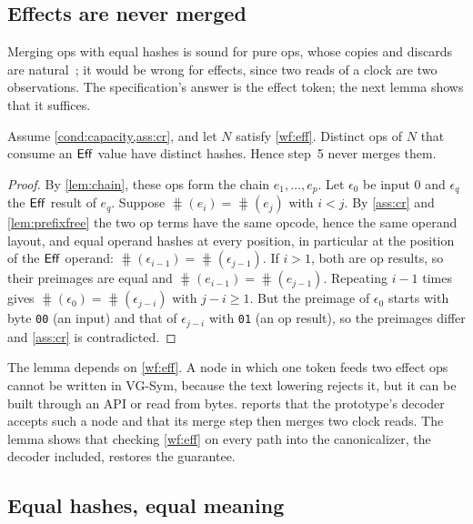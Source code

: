 \subsection{Effects are never merged}

Merging ops with equal hashes is sound for pure ops, whose copies and discards are
natural~\cite{fox1976coalgebras}; it would be wrong for effects, since two reads of a clock are
two observations. The specification's answer is the effect token; the next lemma shows that it
suffices.

\begin{lemma}\label{lem:eff-never-merged}
Assume \cref{cond:capacity,ass:cr}, and let $N$ satisfy \ref{wf:eff}. Distinct ops of $N$ that
consume an $\mathsf{Eff}$ value have distinct hashes. Hence step~5 never merges them.
\end{lemma}
\begin{proof}
By \cref{lem:chain}, these ops form the chain $e_1,\dots,e_p$. Let $\epsilon_0$ be input $0$
and $\epsilon_q$ the $\mathsf{Eff}$ result of $e_q$. Suppose $\hash(e_i)=\hash(e_j)$ with $i<j$. By
\cref{ass:cr} and \cref{lem:prefixfree} the two op terms have the same opcode, hence the same
operand layout, and equal operand hashes at every position, in particular at the position of
the $\mathsf{Eff}$ operand: $\hash(\epsilon_{i-1})=\hash(\epsilon_{j-1})$. If $i>1$, both are op results,
so their preimages are equal and $\hash(e_{i-1})=\hash(e_{j-1})$. Repeating $i-1$ times gives
$\hash(\epsilon_0)=\hash(\epsilon_{j-i})$ with $j-i\ge1$. But the preimage of $\epsilon_0$ starts
with byte \texttt{00} (an input) and that of $\epsilon_{j-i}$ with \texttt{01} (an op result),
so the preimages differ and \cref{ass:cr} is contradicted.
\end{proof}

The lemma depends on \ref{wf:eff}. A node in which one token feeds two effect ops cannot be
written in VG-Sym, because the text lowering rejects it, but it can be built through an API or
read from bytes.  reports that the prototype's decoder accepts such a node
and that its merge step then merges two clock reads. The lemma shows that checking
\ref{wf:eff} on every path into the canonicalizer, the decoder included, restores the
guarantee.

\subsection{Equal hashes, equal meaning}

